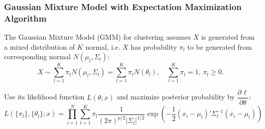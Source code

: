     


\subsubsection{Gaussian Mixture Model with Expectation Maximization Algorithm}\label{SubSubSectionEMAlgorithmForGMM}


        The Gaussian Mixture Model (GMM) for clustering assumes $ X $ is generated from a mixed distribution of $ K $ normal, i.e. $ X $ has probability $ \pi_l $ to be generated from corresponding normal $ N(\mu _l,\Sigma _l) $:
    \begin{equation}
        X\sim \sum_{l=1}^K\pi_lN(\mu_l,\Sigma _l)=\sum_{l=1}^K\pi_lN(\theta _l),\quad \sum_{l=1}^K\pi_l=1,\,\pi_l\geq 0.
    \end{equation}
    
    Use its likelihood function $ L(\theta;x) $ and maximize posterior probability by $ \dfrac{\partial^{} \ell}{\partial \theta ^{}} $:
    \begin{equation}
        L(\{\pi_l\},\{\theta_l \};x)=\prod_{i=1}^N \sum_{l=1}^K\pi_l   \dfrac{1}{(2\pi)^{p/2}|\Sigma _l|^{1/2}}\exp\left(   -\dfrac{1}{2}(x_i-\mu _l)'\Sigma^{-1} _l(x_i-\mu _l)\right)
    \end{equation}
    
